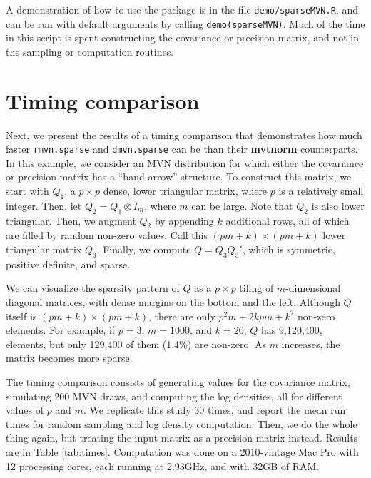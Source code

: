\documentclass[11pt]{article}
\newcommand{\pkg}[1]{\textbf{#1}}
\newcommand{\code}[1]{\texttt{#1}}
\newcommand{\func}[1]{\code{#1}}
\newcommand{\file}[1]{\texttt{#1}}
\newcommand{\kron}{\otimes}
\begin{document}
A demonstration of how to use the package is in the file \file{demo/sparseMVN.R}, and can be run with default arguments by calling \texttt{demo(sparseMVN)}.  Much of the time in this script is spent constructing the covariance or precision matrix, and not in the sampling or computation routines.


\section{Timing comparison}

Next, we present the results of a timing comparison that demonstrates how much faster \func{rmvn.sparse} and \func{dmvn.sparse} can be than their \pkg{mvtnorm} counterparts.  In this example, we consider an MVN distribution for which either the covariance or precision matrix has a ``band-arrow'' structure.  To construct this matrix, we start with $Q_1$, a $p\times p$ dense, lower triangular matrix, where $p$ is a relatively small integer.  Then, let $Q_2=Q_1\kron I_m$, where $m$ can be large.  Note that $Q_2$ is also lower triangular.  Then, we augment $Q_2$ by appending $k$ additional rows, all of which are filled by random non-zero values.  Call this $(pm+k) \times (pm+k)$ lower triangular matrix $Q_3$.  Finally, we compute $Q=Q_3Q_3'$, which is symmetric, positive definite, and sparse. 

We can visualize the sparsity pattern of $Q$ as a $p\times p$ tiling of $m$-dimensional diagonal matrices, with dense margins on the bottom and the left.  Although $Q$ itself is $(pm+k)\times (pm+k)$, there are only $p^2m+2kpm+k^2$ non-zero elements.  For example, if $p=3$, $m=1000$, and $k=20$, $Q$ has 9,120,400, elements, but only 129,400 of them (1.4\%) are non-zero.  As $m$ increases, the matrix becomes more sparse.

The timing comparison consists of generating values for the covariance matrix, simulating 200 MVN draws, and computing the log densities, all for different values of  $p$ and $m$.  We replicate this study 30 times, and report the mean run times for random sampling and log density computation.  Then, we do the whole thing again, but treating the input matrix as a precision matrix instead.  Results are in Table \ref{tab:times}.  Computation was done on a 2010-vintage Mac Pro with 12 processing cores, each running at 2.93GHz, and with 32GB of RAM.
\end{document}
